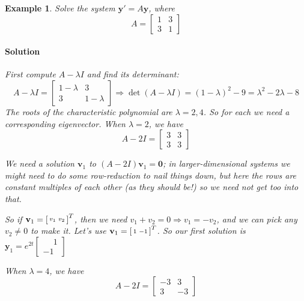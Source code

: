 \documentclass[letterpaper, 11pt, openany]{book}
\theoremstyle{mytheoremstyle}
\theoremstyle{myexamplestyle}
\newtheorem{example}{Example}[section]
\newenvironment{solution}{\paragraph{\sffamily \smaller \fontseries{b}\selectfont Solution}}{\hfill\faSquare}
\begin{document}
\begin{example}
    Solve the system \(\mathbf{y}' = A \mathbf{y}\), where
    \[A = \begin{bmatrix}
        1 & 3 \\ 3 & 1
    \end{bmatrix}\]
    \begin{solution}
        First compute \(A - \lambda I\) and find its determinant:
        \[
            A - \lambda I = \begin{bmatrix}
                1 - \lambda & 3 \\ 3 & 1 - \lambda
            \end{bmatrix} \Rightarrow \det(A - \lambda I) = (1- \lambda)^2 - 9 = \lambda^2 - 2 \lambda -8
        \]
        The roots of the characteristic polynomial are \(\lambda = 2,4\). So for each we need a corresponding eigenvector. When \(\lambda  = 2\), we have
        \[A - 2I = \begin{bmatrix} 3 & 3 \\ 3 & 3 \end{bmatrix}\]

        We need a solution \(\mathbf{v}_{1}\) to \((A - 2 I)\mathbf{v}_{1} = \mathbf{0}\); in larger-dimensional systems we might need to do some row-reduction to nail things down, but here the rows are constant multiples of each other (as they should be!) so we need not get too into that.
        
        So if \(\mathbf{v}_{1} = \begin{bsmallmatrix}
            v_1 & v_2
        \end{bsmallmatrix}^{T}\), then we need \(v_1 + v_2 = 0 \Rightarrow v_1 = -v_2\), and we can pick any \(v_2 \neq 0\) to make it. Let's use \(\mathbf{v}_{1} = \begin{bsmallmatrix}
            1 & -1
        \end{bsmallmatrix}^{T}\). So our first solution is \(\mathbf{y}_{1} = e^{2t} \begin{bmatrix}
            \phantom{-}1 \\ -1
        \end{bmatrix}\)

        When \(\lambda  = 4\), we have
        \[A - 2I = \begin{bmatrix} -3 & 3 \\ 3 & -3 \end{bmatrix}\]
               

\end{solution}
\end{example}
\end{document}
